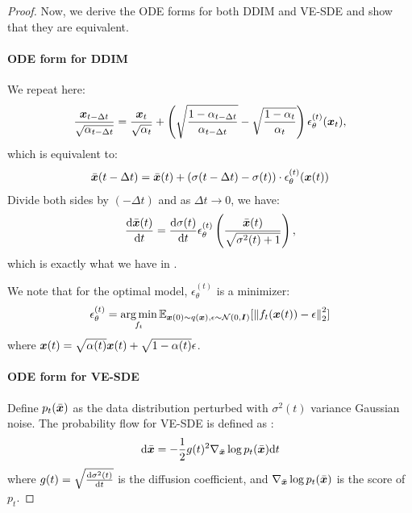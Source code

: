 \begin{proof}
Now, we derive the ODE forms for both DDIM and VE-SDE and show that they are equivalent.

\paragraph{ODE form for DDIM} We repeat  here:
\begin{align}
    \frac{{\bm{x}}_{t-\Delta t}}{\sqrt{\alpha_{t-\Delta t}}}  = \frac{{\bm{x}}_t}{\sqrt{\alpha_t}}  + \left(\sqrt{\frac{1 - \alpha_{t-\Delta t}}{\alpha_{t-\Delta t}}} - \sqrt{\frac{1 - \alpha_{t}}{\alpha_t}}\right) \epsilon_\theta^{(t)}({\bm{x}}_t),
\end{align}
which is equivalent to:
\begin{align}
    \bar{{\bm{x}}}(t-\Delta t) = \bar{{\bm{x}}}(t) + (\sigma(t-\Delta t) - \sigma(t)) \cdot \epsilon_\theta^{(t)}({\bm{x}}(t))
\end{align}
Divide both sides by $(-\Delta t)$ and as $\Delta t \to 0$, we have:
\begin{align}
    \frac{\mathrm{d} \bar{{\bm{x}}}(t)}{\mathrm{d} t} = \frac{\mathrm{d} \sigma(t)}{\mathrm{d} t} \epsilon_\theta^{(t)}\left(\frac{\bar{{\bm{x}}}(t)}{\sqrt{\sigma^2(t) + 1}}\right), \label{eq:ddim:differential}
\end{align}
which is exactly what we have in . 

We note that for the optimal model, $\epsilon_\theta^{(t)}$ is a minimizer:
\begin{align}
    \epsilon_\theta^{(t)} = \operatorname*{arg\,min}_{f_t} {\mathbb{E}}_{{\bm{x}}(0) \sim q({\bm{x}}), \epsilon \sim {\mathcal{N}}(0, {\bm{I}})}[{\lVert {f_t({\bm{x}}(t)) - \epsilon} \rVert}_2^2] \label{eq:dsm-ddim}
\end{align}
where ${\bm{x}}(t) = \sqrt{\alpha(t)} {\bm{x}}(t) + \sqrt{1 - \alpha(t)} \epsilon$.

\paragraph{ODE form for VE-SDE} Define $p_t(\bar{{\bm{x}}})$ as the data distribution perturbed with $\sigma^2(t)$ variance Gaussian noise. The probability flow for VE-SDE is defined as \cite{song2020score}:
\begin{align}
    \mathrm{d} \bar{{\bm{x}}} = -\frac{1}{2} g(t)^2 \nabla_{\bar{{\bm{x}}}} \log p_t(\bar{{\bm{x}}}) \mathrm{d} t  \label{eq:yang-ode}
\end{align}
where $g(t) = \sqrt{\frac{\mathrm{d} \sigma^2(t)}{\mathrm{d} t}}$ is the diffusion coefficient, and $\nabla_{\bar{{\bm{x}}}} \log p_t(\bar{{\bm{x}}})$ is the score of $p_t$. 


\end{proof}
